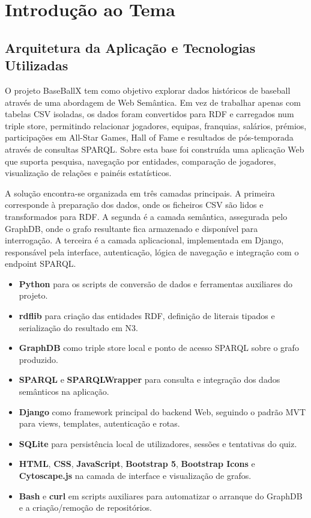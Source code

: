 \chapter{Introdu\c{c}\~ao ao Tema}

\section{Arquitetura da Aplica\c{c}\~ao e Tecnologias Utilizadas}

O projeto BaseBallX tem como objetivo explorar dados hist\'oricos de baseball atrav\'es de uma abordagem de Web Sem\^antica. Em vez de trabalhar apenas com tabelas CSV isoladas, os dados foram convertidos para RDF e carregados num triple store, permitindo relacionar jogadores, equipas, franquias, sal\'arios, pr\'emios, participa\c{c}\~oes em All-Star Games, Hall of Fame e resultados de p\'os-temporada atrav\'es de consultas SPARQL. Sobre esta base foi constru\'ida uma aplica\c{c}\~ao Web que suporta pesquisa, navega\c{c}\~ao por entidades, compara\c{c}\~ao de jogadores, visualiza\c{c}\~ao de rela\c{c}\~oes e pain\'eis estat\'isticos.

A solu\c{c}\~ao encontra-se organizada em tr\^es camadas principais. A primeira corresponde \`a prepara\c{c}\~ao dos dados, onde os ficheiros CSV s\~ao lidos e transformados para RDF. A segunda \'{e} a camada sem\^antica, assegurada pelo GraphDB, onde o grafo resultante fica armazenado e dispon\'ivel para interroga\c{c}\~ao. A terceira \'{e} a camada aplicacional, implementada em Django, respons\'avel pela interface, autentica\c{c}\~ao, l\'ogica de navega\c{c}\~ao e integra\c{c}\~ao com o endpoint SPARQL.

\begin{itemize}[leftmargin=*]
  \item \textbf{Python} para os scripts de convers\~ao de dados e ferramentas auxiliares do projeto.
  \item \textbf{rdflib} para cria\c{c}\~ao das entidades RDF, defini\c{c}\~ao de literais tipados e serializa\c{c}\~ao do resultado em N3.
  \item \textbf{GraphDB} como triple store local e ponto de acesso SPARQL sobre o grafo produzido.
  \item \textbf{SPARQL} e \textbf{SPARQLWrapper} para consulta e integra\c{c}\~ao dos dados sem\^anticos na aplica\c{c}\~ao.
  \item \textbf{Django} como framework principal do backend Web, seguindo o padr\~ao MVT para views, templates, autentica\c{c}\~ao e rotas.
  \item \textbf{SQLite} para persist\^encia local de utilizadores, sess\~oes e tentativas do quiz.
  \item \textbf{HTML}, \textbf{CSS}, \textbf{JavaScript}, \textbf{Bootstrap 5}, \textbf{Bootstrap Icons} e \textbf{Cytoscape.js} na camada de interface e visualiza\c{c}\~ao de grafos.
  \item \textbf{Bash} e \textbf{curl} em scripts auxiliares para automatizar o arranque do GraphDB e a cria\c{c}\~ao/remo\c{c}\~ao de reposit\'orios.
\end{itemize}


